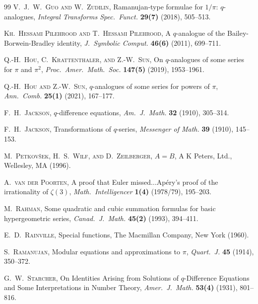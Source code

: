 \documentclass[12pt]{article}
\begin{document}
\begin{thebibliography}{99}
 \textsc{V.\ J.\ W.\ Guo and W.\ Zudilin}, 
 Ramanujan-type formulae for {$1/\pi$}: {$q$}-analogues, 
 \emph{Integral Transforms Spec.\ Funct.} {\bf 29(7)} (2018), 505--513. 
 
 \textsc{Kh.\ Hessami Pilehrood and T.\ Hessami Pilehrood}, 
 A {$q$}-analogue of the {B}ailey-{B}orwein-{B}radley identity, 
 \emph{J.\ Symbolic Comput.} {\bf 46(6)} (2011), 699--711. 

 \textsc{Q.-H.\ Hou, C.\ Krattenthaler, and Z.-W.\ Sun}, 
 On {$q$}-analogues of some series for {$\pi$} and {$\pi^2$}, 
 \emph{Proc.\ Amer.\ Math.\ Soc.} {\bf 147(5)} (2019), 1953--1961. 

 \textsc{Q.-H.\ Hou and Z.-W.\ Sun}, 
 {$q$}-analogues of some series for powers of {$\pi$}, 
 \emph{Ann.\ Comb.} {\bf 25(1)} (2021), 167--177. 

 \textsc{F.\ H.\ Jackson}, 
 {{\(q\)}}-difference equations, 
 \emph{Am.\ J.\ Math.} {\bf 32} (1910), 305--314. 

 \textsc{F.\ H.\ Jackson}, 
 Transformations of $q$-series, 
 \emph{Messenger of Math.} {\bf 39} (1910), 145--153. 

 \textsc{M.\ Petkov\v sek, H.\ S.\ Wilf, and D.\ Zeilberger}, 
 {{$A=B$}}, 
 A K Peters, Ltd., Wellesley, MA (1996). 
 
 \textsc{A.\ van der Poorten}, 
 A proof that {E}uler missed{$\ldots $}Ap\'ery's proof of the irrationality of {$\zeta (3)$}, 
 \emph{Math.\ Intelligencer} {\bf 1(4)} (1978/79), 195--203. 

 \textsc{M.\ Rahman}, 
 Some quadratic and cubic summation formulas for basic hypergeometric series, 
 \emph{Canad.\ J.\ Math.} {\bf 45(2)} (1993), 394--411. 

 \textsc{E.\ D.\ Rainville}, 
 Special functions, 
 The Macmillan Company, New York (1960). 

 \textsc{S.\ Ramanujan}, 
 Modular equations and approximations to $\pi$, 
 \emph{Quart.\ J.} {\bf 45} (1914), 350--372. 

 \textsc{G.\ W.\ Starcher}, 
 On {I}dentities {A}rising from {S}olutions of {$q$}-{D}ifference {E}quations and {S}ome {I}nterpretations in {N}umber {T}heory, 
 \emph{Amer.\ J.\ Math.} {\bf 53(4)} (1931), 801--816. 


\end{thebibliography}
\end{document}
